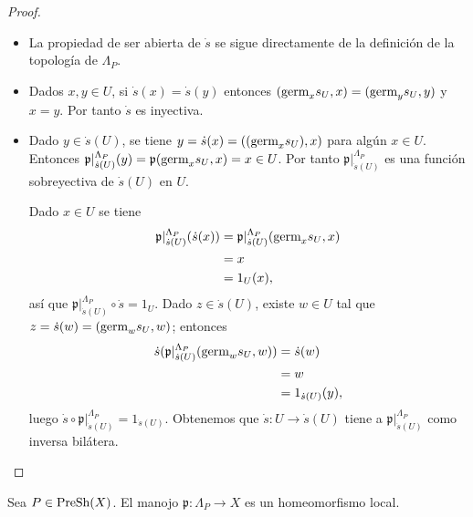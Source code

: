\begin{proof}
   \begin{itemize}
      \item La propiedad de ser abierta de $\dot{s}$ se sigue directamente de la definición de la topología de $\Lambda_P$.
      \item Dados $x,y\in U$, si $\dot{s}(x)=\dot{s}(y)$ entonces $(\normalfont{\text{germ}}_{x}s_{U},x)=(\normalfont{\text{germ}}_{y}s_{U},y)$ y $x=y$. Por tanto $\dot{s}$ es inyectiva.
      \item Dado $y\in \dot{s}(U)$, se tiene $y=\dot{s}(x)=((\normalfont{\text{germ}}_{x}s_{U}),x)$ para algún $x\in U$. Entonces $\mathfrak{p}|^{\Lambda_P}_{\dot{s}(U)}(y)=\mathfrak{p}(\normalfont{\text{germ}}_{x}s_{U},x)=x\in U$. Por tanto $\mathfrak{p}|^{\Lambda_P}_{\dot{s}(U)}$ es una función sobreyectiva de $\dot{s}(U)$ en $U$.
         
         Dado $x\in U$ se tiene
         $$
         \begin{aligned}
            \mathfrak{p}|^{\Lambda_P}_{\dot{s}(U)}(\dot{s}(x))&=\mathfrak{p}|^{\Lambda_P}_{\dot{s}(U)}(\normalfont{\text{germ}}_{x}s_{U},x)\\
                                                              &=x\\
                                                              &=1_{U}(x),
         \end{aligned}
         $$
         así que $\mathfrak{p}|^{\Lambda_P}_{\dot{s}(U)}\circ \dot{s}=1_{U}$. Dado $z\in\dot{s}(U)$, existe $w\in U$ tal que $z=\dot{s}(w)=(\normalfont{\text{germ}}_{w}s_{U},w)$; entonces
         $$
         \begin{aligned}
            \dot{s}(\mathfrak{p}|^{\Lambda_P}_{\dot{s}(U)}(\normalfont{\text{germ}}_{w}s_{U},w))&=\dot{s}(w)\\
                                                                             &=w\\
                                                                             &=1_{\dot{s}(U)}(y),
         \end{aligned}
         $$
         luego $\dot{s}\circ\mathfrak{p}|^{\Lambda_P}_{\dot{s}(U)}=1_{\dot{s}(U)}$. Obtenemos que $\dot{s}:U\to\dot{s}(U)$ tiene a $\mathfrak{p}|^{\Lambda_P}_{\dot{s}(U)}$ como inversa bilátera.
   \end{itemize}
\end{proof}
\begin{Cor}
   Sea $P\in\normalfont{\text{PreSh}}(X)$. El manojo $\mathfrak{p}:\Lambda_P\to X$ es un homeomorfismo local.
\end{Cor}

